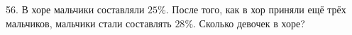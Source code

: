 56. В хоре мальчики составляли $25\%.$ После того, как в хор приняли ещё трёх мальчиков, мальчики стали составлять $28\%.$ Сколько девочек в хоре?\\

